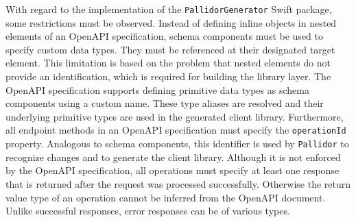 With regard to the implementation of the \texttt{PallidorGenerator} Swift package, some restrictions must be observed. Instead of defining inline objects in nested elements of an OpenAPI specification, schema components must be used to specify custom data types. They must be referenced at their designated target element. This limitation is based on the problem that nested elements do not provide an identification, which is required for building the library layer. The OpenAPI specification supports defining primitive data types as schema components using a custom name. These type aliases are resolved and their underlying primitive types are used in the generated client library. Furthermore, all endpoint methods in an OpenAPI specification must specify the \texttt{operationId} property. Analogous to schema components, this identifier is used by \texttt{Pallidor} to recognize changes and to generate the client library. Although it is not enforced by the OpenAPI specification, all operations must specify at least one response that is returned after the request was processed successfully. Otherwise the return value type of an operation cannot be inferred from the OpenAPI document. Unlike successful responses, error responses can be of various types.